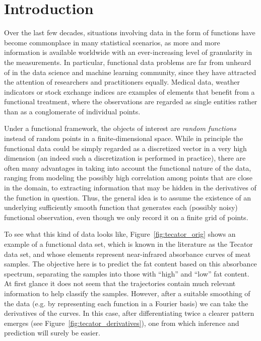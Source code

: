 %
%

\chapter{Introduction}\label{ch:introduction}

Over the last few decades, situations involving data in the form of functions have become commonplace in many statistical scenarios, as more and more information is available worldwide with an ever-increasing level of granularity in the measurements. In particular, functional data problems are far from unheard of in the data science and machine learning community, since they have attracted the attention of researchers and practitioners equally. Medical data, weather indicators or stock exchange indices are examples of elements that benefit from a functional treatment, where the observations are regarded as single entities rather than as a conglomerate of individual points.

Under a functional framework, the objects of interest are \textit{random functions} instead of random points in a finite-dimensional space. While in principle the functional data could be simply regarded as a discretized vector in a very high dimension (an indeed such a discretization is performed in practice), there are often many advantages in taking into account the functional nature of the data, ranging from modeling the possibly high correlation among points that are close in the domain, to extracting information that may be hidden in the derivatives of the function in question. Thus, the general idea is to assume the existence of an underlying sufficiently smooth function that generates each (possibly noisy) functional observation, even though we only record it on a finite grid of points.

To see what this kind of data looks like, Figure~\ref{fig:tecator_orig} shows an example of a functional data set, which is known in the literature as the Tecator data set, and whose elements represent near-infrared absorbance curves of meat samples. The objective here is to predict the fat content based on this absorbance spectrum, separating the samples into those with ``high'' and ``low'' fat content. At first glance it does not seem that the trajectories contain much relevant information to help classify the samples. However, after a suitable smoothing of the data (e.g. by representing each function in a Fourier basis) we can take the derivatives of the curves. In this case, after differentiating twice a clearer pattern emerges (see Figure~\ref{fig:tecator_derivatives}), one from which inference and prediction will surely be easier.

